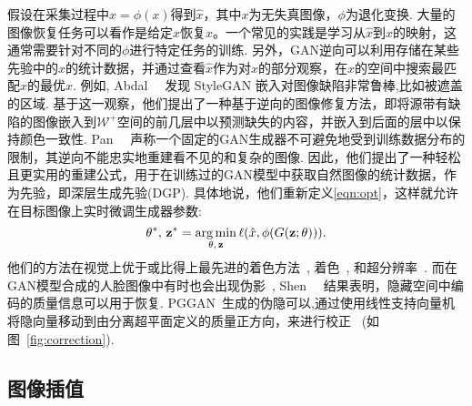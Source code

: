 假设在采集过程中$\hat{x}=\phi(x)$得到$\hat{x}$，其中$x$为无失真图像，$\phi$为退化变换.
大量的图像恢复任务可以看作是给定$\hat{x}$恢复$x$。一个常见的实践是学习从$\hat{x}$到$x$的映射，这通常需要针对不同的$\phi$进行特定任务的训练.
另外，GAN逆向可以利用存储在某些先验中的$x$的统计数据，并通过查看$\hat{x}$作为对$x$的部分观察，在$x$的空间中搜索最匹配$\hat{x}$的最优$x$.
例如, Abdal~\etal~\cite{abdal2019image2stylegan,abdal2020image2stylegan2} 发现 StyleGAN 嵌入对图像缺陷非常鲁棒,比如被遮盖的区域.
基于这一观察，他们提出了一种基于逆向的图像修复方法，即将源带有缺陷的图像嵌入到$\mathcal{W}^+$空间的前几层中以预测缺失的内容，并嵌入到后面的层中以保持颜色一致性.
Pan~\etal~\cite{pan2020exploiting} 声称一个固定的GAN生成器不可避免地受到训练数据分布的限制，其逆向不能忠实地重建看不见的和复杂的图像.
因此，他们提出了一种轻松且更实用的重建公式，用于在训练过的GAN模型中获取自然图像的统计数据，作为先验，即深层生成先验(DGP).
具体地说，他们重新定义\eqref{eqn:opt}，这样就允许在目标图像上实时微调生成器参数:
\begin{equation}
\theta^*,\, \z^* = \underset{\theta,\, \z}{\arg\min}\, \ell(\hat{x}, \phi(G(\z; \theta))).
\label{eqn:opt_dgp}
\end{equation}
他们的方法在视觉上优于或比得上最先进的着色方法~\cite{larsson2016learning}, 着色~\cite{ulyanov2018deep}, 和超分辨率~\cite{shaham2019singan}.
而在GAN模型合成的人脸图像中有时也会出现伪影~\cite{karras2017progressive,karras2019style}, 
Shen~\etal~\cite{shen2020interpreting} 结果表明，隐藏空间中编码的质量信息可以用于恢复. 
PGGAN~\cite{karras2017progressive}生成的伪隐可以,通过使用线性支持向量机将隐向量移动到由分离超平面定义的质量正方向，来进行校正~\cite{cortes1995support} (如图~\ref{fig:correction}). 
 
\subsection{图像插值}
\label{sec:interpolation}

